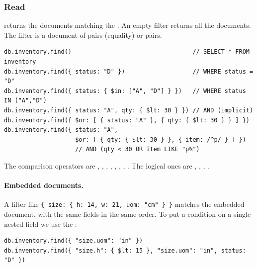 \subsubsection{Read}
 returns the documents matching the . An empty filter returns all the documents. The filter is a document of  pairs (equality) or  pairs.
\begin{lstlisting}
db.inventory.find()                                  // SELECT * FROM inventory
db.inventory.find({ status: "D" })                   // WHERE status = "D"
db.inventory.find({ status: { $in: ["A", "D"] } })   // WHERE status IN ("A","D")
db.inventory.find({ status: "A", qty: { $lt: 30 } }) // AND (implicit)
db.inventory.find({ $or: [ { status: "A" }, { qty: { $lt: 30 } } ] })
db.inventory.find({ status: "A",
                    $or: [ { qty: { $lt: 30 } }, { item: /^p/ } ] })
                    // AND (qty < 30 OR item LIKE "p%")
\end{lstlisting}
The comparison operators are , , , , , , , . The logical ones are , , , .

\paragraph{Embedded documents.} A filter like \texttt{\{ size: \{ h: 14, w: 21, uom: "cm" \} \}} matches the  embedded document, with the same fields in the same order. To put a condition on a single nested field we use the :
\begin{lstlisting}
db.inventory.find({ "size.uom": "in" })
db.inventory.find({ "size.h": { $lt: 15 }, "size.uom": "in", status: "D" })
\end{lstlisting}

